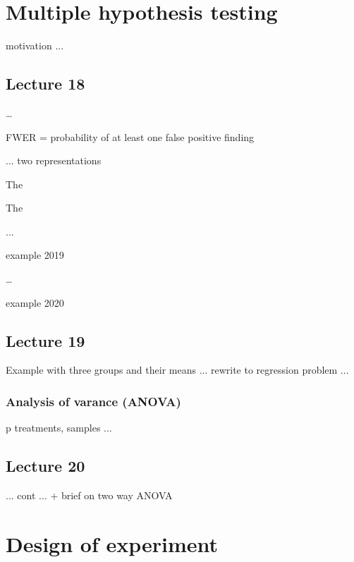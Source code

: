 \newpage\section{Multiple hypothesis testing}


motivation ...

\subsection*{Lecture 18}

\dots


FWER = probability of at least one false positive finding


... two representations 


The 

  

The 


...

example 2019 



\dots

example 2020


\subsection*{Lecture 19}

Example with three groups and their means ... rewrite to regression problem ...


 

\subsubsection*{Analysis of varance (ANOVA)}
p treatments, samples ...

 


\subsection*{Lecture  20}


... cont ... + brief on two way ANOVA


\newpage\section{Design of experiment}

